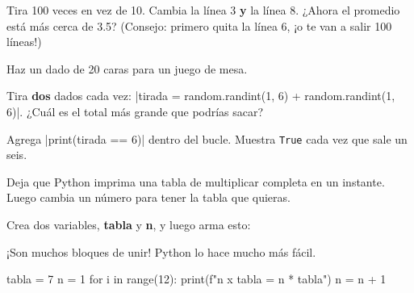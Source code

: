 \begin{challenge}
\tick Tira 100 veces en vez de 10. Cambia la línea 3 \textbf{y} la línea 8. ¿Ahora el promedio está más cerca de 3.5? (Consejo: primero quita la línea 6, ¡o te van a salir 100 líneas!)\par
\tick Haz un dado de 20 caras para un juego de mesa.\par
\tick Tira \textbf{dos} dados cada vez: \py|tirada = random.randint(1, 6) + random.randint(1, 6)|. ¿Cuál es el total más grande que podrías sacar?\par
\tick Agrega \py|print(tirada == 6)| dentro del bucle. Muestra \texttt{True} cada vez que sale un seis.
\end{challenge}


Deja que Python imprima una tabla de multiplicar completa en un instante. Luego cambia un número para tener la tabla que quieras.

Crea dos variables, \textbf{tabla} y \textbf{n}, y luego arma esto:

\begin{center}
\begin{scratch}
\end{scratch}
\end{center}

¡Son muchos bloques de unir! Python lo hace mucho más fácil.


\begin{typethis}
tabla = 7
n = 1
for i in range(12):
    print(f"{n} x {tabla} = {n * tabla}")
    n = n + 1
\end{typethis}


